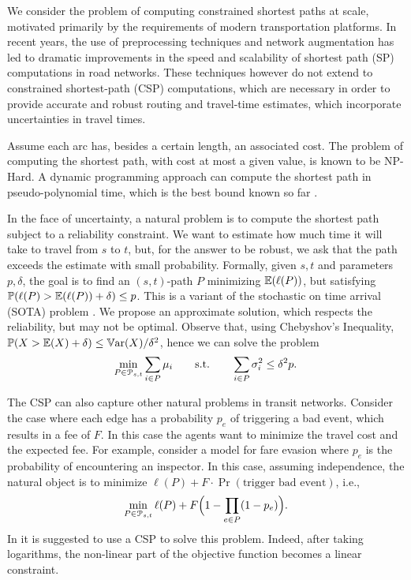 

We consider the problem of computing constrained shortest paths at scale, motivated primarily by the requirements of modern transportation platforms. 
In recent years, the use of preprocessing techniques and network augmentation has led to dramatic improvements in the speed and scalability of shortest path (SP) computations in road networks.
These techniques however do not extend to constrained shortest-path (CSP) computations, which are necessary in order to provide accurate and robust routing and travel-time estimates, which incorporate uncertainties in travel times.


Assume each arc has, besides a certain length, an associated cost. 
The problem of computing the shortest path, with cost at most a given value, is known to be NP-Hard.
A dynamic programming approach can compute the shortest path in pseudo-polynomial time, which is the best bound known so far .

In the face of uncertainty, a natural problem is to compute the shortest path subject to a reliability constraint.
We want to estimate how much time it will take to travel from $s$ to $t$, but, for the answer to be robust, we ask that the path exceeds the estimate with small probability.
Formally, given $s,t$ and parameters $p,\delta$, the goal is to find an $(s,t)$-path $P$ minimizing $\mathbb{E}(\ell(P))$, but satisfying $\mathbb{P}(\ell(P)>\mathbb{E}(\ell(P))+\delta)\leq p$.
This is a variant of the stochastic on time arrival (SOTA) problem \cite{fan2005arriving}.
We propose an approximate solution, which respects the reliability, but may not be optimal.
Observe that, using Chebyshov's Inequality, $\mathbb{P}(X>\mathbb{E}(X)+\delta)\leq \mathbb{V}\textnormal{ar}(X)/\delta^2$, hence we can solve
the problem 
\[
\min_{ P\in\mathcal{P}_{s,t}}\sum_{i\in P}\mu_i \qquad \text{s.t.}\qquad \sum_{i\in P}\sigma^2_i\leq \delta^2p.
\]


The CSP can also capture other natural problems in transit networks.
Consider the case where each edge has a probability $p_e$ of triggering a bad event, which results in a fee of $F$.
In this case the agents want to minimize the travel cost and the expected fee.
For example, \citet{fareevasion} consider a model for fare evasion where $p_e$ is the probability of encountering an inspector.
In this case, assuming independence, the natural object is to minimize $\ell(P)+F\cdot\Pr(\text{trigger bad event})$, i.e.,
\[
\min_{P\in\mathcal{P}_{s,t}} \ell(P)+F\Bigl(1-\prod_{e\in P}(1-p_e)\Bigr).
\]
In \citep{fareevasion} it is suggested to use a CSP to solve this problem.
Indeed, after taking logarithms, the non-linear part of the objective function becomes a linear constraint.

